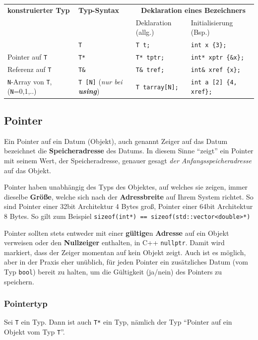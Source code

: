 \documentclass[a4paper]{report}
\begin{document}
\begin{center}
	\begin{tabular}{|l|l|l|l|} \hline
		\textbf{konstruierter Typ} & \textbf{Typ-Syntax} & \multicolumn{2}{c|}{\textbf{Deklaration eines Bezeichners}}\\ 
		&& Deklaration (allg.) & Initialisierung (Bsp.) \\ \hline
		[identischer Typ] & \texttt{T} & \texttt{T t;} & \texttt{int x \{3\};} \\ \hline
		Pointer auf \texttt{T} & \texttt{T*} & \texttt{T* tptr;} & \texttt{int* xptr \{\&x\};} \\ \hline
		Referenz auf \texttt{T} & \texttt{T\&} & \texttt{T\& tref;} & \texttt{int\& xref \{x\};} \\ \hline
		\texttt{N}-Array von \texttt{T}, (\texttt{N}=0,1,..)& \texttt{T [N]} (\textit{nur bei \textbf{using}}) & \texttt{T tarray[N];} & \texttt{int a [2] \{4, xref\};} \\ \hline
	\end{tabular}
\end{center}

\subsection{Pointer}
Ein Pointer auf ein Datum (Objekt), auch genannt Zeiger auf das Datum bezeichnet die \textbf{Speicheradresse} des Datums. In diesem Sinne "`zeigt"' ein Pointer mit seinem Wert, der Speicheradresse, genauer gesagt \textit{der Anfangsspeicheradresse} auf das Objekt.
\medskip

Pointer haben unabhängig des Typs des Objektes, auf welches sie zeigen, immer dieselbe \textbf{Größe}, welche sich nach der \textbf{Adressbreite} auf Ihrem System richtet. So sind Pointer einer 32bit Architektur 4 Bytes groß, Pointer einer 64bit Architektur 8 Bytes. So gilt zum Beispiel \texttt{sizeof(int*) == sizeof(std::vector<double>*)}
\medskip

Pointer sollten stets entweder mit einer \textbf{gültige}n \textbf{Adresse} auf ein Objekt verweisen oder den \textbf{Nullzeiger} enthalten, in C++ \texttt{nullptr}. Damit wird markiert, dass der Zeiger momentan auf kein Objekt zeigt. Auch ist es möglich, aber in der Praxis eher unüblich, für jeden Pointer ein zusätzliches Datum (vom Typ \texttt{bool}) bereit zu halten, um die Gültigkeit (ja/nein) des Pointers zu speichern.

\subsubsection{Pointertyp}
Sei \texttt{T} ein Typ. Dann ist auch \texttt{T*} ein Typ, nämlich der Typ "`Pointer auf ein Objekt vom Typ \texttt{T}"'.
\end{document}
